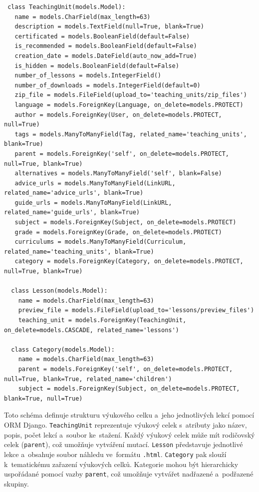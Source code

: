 \documentclass[male,czech,api_bc]{kitheses}
\begin{document}
\begin{lstlisting}
 class TeachingUnit(models.Model):
   name = models.CharField(max_length=63)
   description = models.TextField(null=True, blank=True)
   certificated = models.BooleanField(default=False)
   is_recommended = models.BooleanField(default=False)
   creation_date = models.DateField(auto_now_add=True)
   is_hidden = models.BooleanField(default=False)
   number_of_lessons = models.IntegerField()
   number_of_downloads = models.IntegerField(default=0)
   zip_file = models.FileField(upload_to='teaching_units/zip_files')
   language = models.ForeignKey(Language, on_delete=models.PROTECT)
   author = models.ForeignKey(User, on_delete=models.PROTECT, null=True)
   tags = models.ManyToManyField(Tag, related_name='teaching_units', blank=True)
   parent = models.ForeignKey('self', on_delete=models.PROTECT, null=True, blank=True)
   alternatives = models.ManyToManyField('self', blank=False)
   advice_urls = models.ManyToManyField(LinkURL, related_name='advice_urls', blank=True)
   guide_urls = models.ManyToManyField(LinkURL, related_name='guide_urls', blank=True)
   subject = models.ForeignKey(Subject, on_delete=models.PROTECT)
   grade = models.ForeignKey(Grade, on_delete=models.PROTECT)
   curriculums = models.ManyToManyField(Curriculum, related_name='teaching_units', blank=True)
   category = models.ForeignKey(Category, on_delete=models.PROTECT, null=True, blank=True)
	
  class Lesson(models.Model):
    name = models.CharField(max_length=63)
    preview_file = models.FileField(upload_to='lessons/preview_files')
    teaching_unit = models.ForeignKey(TeachingUnit, on_delete=models.CASCADE, related_name='lessons')
	
  class Category(models.Model):
    name = models.CharField(max_length=63)
    parent = models.ForeignKey('self', on_delete=models.PROTECT, null=True, blank=True, related_name='children')
    subject = models.ForeignKey(Subject, on_delete=models.PROTECT, blank=True, null=True)
\end{lstlisting}

Toto schéma definuje strukturu výukového celku a~jeho jednotlivých lekcí pomocí ORM Django. \texttt{TeachingUnit} reprezentuje výukový celek s~atributy jako název, popis, počet lekcí a~soubor ke~stažení. Každý výukový celek může mít rodičovský celek (\texttt{parent}), což umožňuje vytváření mutací. \texttt{Lesson} představuje jednotlivé lekce a~obsahuje soubor náhledu ve~formátu \texttt{.html}. \texttt{Category} pak slouží k~tematickému zařazení výukových celků. Kategorie mohou být hierarchicky uspořádané pomocí vazby \texttt{parent}, což umožňuje vytvářet nadřazené a~podřazené skupiny.
\end{document}
